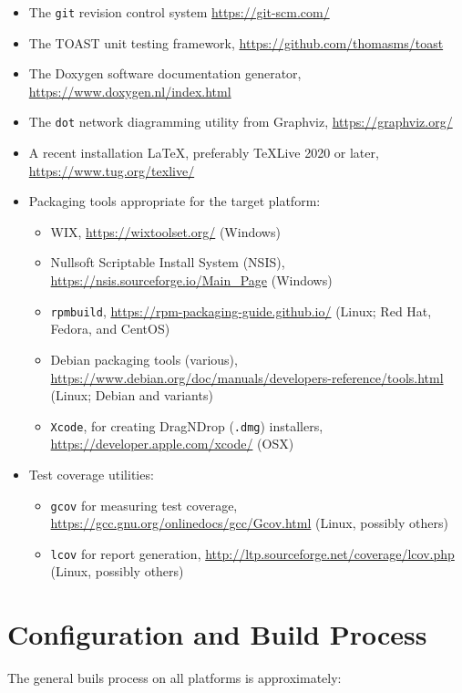\begin{itemize}
    \item The \texttt{git} revision control system
    \url{https://git-scm.com/}
    \item The TOAST unit testing framework, \url{https://github.com/thomasms/toast}
    \item The Doxygen software documentation generator, \url{https://www.doxygen.nl/index.html}
    \item The \texttt{dot} network diagramming utility from Graphviz, \url{https://graphviz.org/}
    \item A recent installation \LaTeX, preferably TeXLive 2020 or later, \url{https://www.tug.org/texlive/}
    \item Packaging tools appropriate for the target platform:
    \begin{itemize}
        \item WIX, \url{https://wixtoolset.org/} (Windows)
        \item Nullsoft Scriptable Install System (NSIS), \url{https://nsis.sourceforge.io/Main_Page} (Windows)
        \item \texttt{rpmbuild}, \url{https://rpm-packaging-guide.github.io/} (Linux; Red Hat, Fedora, and CentOS)
        \item Debian packaging tools (various), \url{https://www.debian.org/doc/manuals/developers-reference/tools.html} (Linux; Debian and variants)
        \item \texttt{Xcode}, for creating DragNDrop (\texttt{.dmg}) installers, \url{https://developer.apple.com/xcode/} (OSX)
    \end{itemize}
    \item Test coverage utilities:
    \begin{itemize}
        \item \texttt{gcov} for measuring test coverage, \url{https://gcc.gnu.org/onlinedocs/gcc/Gcov.html} (Linux, possibly others)
        \item \texttt{lcov} for report generation, \url{http://ltp.sourceforge.net/coverage/lcov.php} (Linux, possibly others)
    \end{itemize}
\end{itemize}

\section{Configuration and Build Process}

The general buils process on all platforms is approximately:

